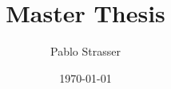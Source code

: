 \documentclass[a4paper]{master}
\title{Master Thesis}
\author{Pablo Strasser}
\date{\today}
\begin{document}
\maketitle
\dominitoc
\tableofcontents



\end{document}
